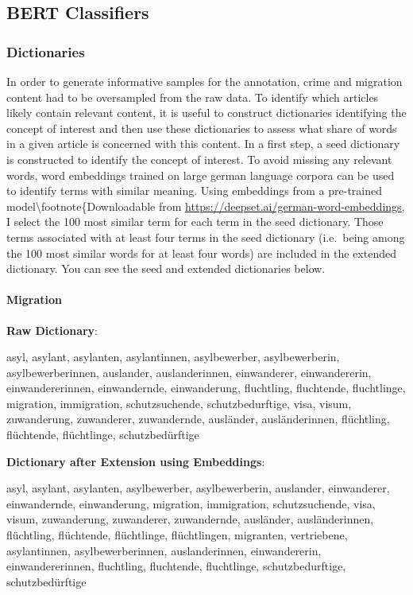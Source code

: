 \documentclass[
]{article}
\begin{document}
\hypertarget{bert-classifiers}{%
\subsection{BERT Classifiers}\label{bert-classifiers}}

\hypertarget{dictionaries}{%
\subsubsection{Dictionaries}\label{dictionaries}}

In order to generate informative samples for the annotation, crime and migration content had to be oversampled from the raw data. To identify which articles likely contain relevant content, it is useful to construct dictionaries identifying the concept of interest and then use these dictionaries to assess what share of words in a given article is concerned with this content. In a first step, a seed dictionary is constructed to identify the concept of interest. To avoid missing any relevant words, word embeddings trained on large german language corpora can be used to identify terms with similar meaning. Using embeddings from a pre-trained model\textbackslash footnote\{Downloadable from \url{https://deepset.ai/german-word-embeddings}, I select the 100 most similar term for each term in the seed dictionary. Those terms associated with at least four terms in the seed dictionary (i.e.~being among the 100 most similar words for at least four words) are included in the extended dictionary. You can see the seed and extended dictionaries below.

\hypertarget{migration}{%
\paragraph{Migration}\label{migration}}

\textbf{Raw Dictionary}:

asyl, asylant, asylanten, asylantinnen, asylbewerber, asylbewerberin, asylbewerberinnen, auslander, auslanderinnen, einwanderer, einwandererin, einwandererinnen, einwandernde, einwanderung, fluchtling, fluchtende, fluchtlinge, migration, immigration, schutzsuchende, schutzbedurftige, visa, visum, zuwanderung, zuwanderer, zuwandernde, ausländer, ausländerinnen, flüchtling, flüchtende, flüchtlinge, schutzbedürftige

\textbf{Dictionary after Extension using Embeddings}:

asyl, asylant, asylanten, asylbewerber, asylbewerberin, auslander, einwanderer, einwandernde, einwanderung, migration, immigration, schutzsuchende, visa, visum, zuwanderung, zuwanderer, zuwandernde, ausländer, ausländerinnen, flüchtling, flüchtende, flüchtlinge, flüchtlingen, migranten, vertriebene, asylantinnen, asylbewerberinnen, auslanderinnen, einwandererin, einwandererinnen, fluchtling, fluchtende, fluchtlinge, schutzbedurftige, schutzbedürftige
\end{document}
